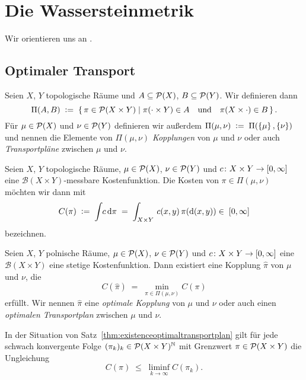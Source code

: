 \documentclass[../main/main.tex]{subfiles}
\begin{document}
	
	\section{Die Wassersteinmetrik}
	
	Wir orientieren uns an \cite{Villani.2009}.
	
	\subsection{Optimaler Transport}
	
	\begin{Definition}[Kopplung]
		Seien $X$, $Y$ topologische Räume und $A \subseteq \mathcal{P}(X)$, $B \subseteq \mathcal{P}(Y)$. Wir definieren dann
		\[ \Pi(A, B) \; \vcentcolon = \; \left\{\, \pi \in \mathcal{P}(X \times Y) \; \middle| \; \pi(\cdot \times Y) \in A \quad \text{und} \quad \pi(X \times \cdot) \in B \,\right\} \text{.}\]
		Für $\mu \in \mathcal{P}(X)$ und $\nu \in \mathcal{P}(Y)$ definieren wir außerdem $\Pi(\mu, \nu) \; \vcentcolon = \; \Pi(\left\{\mu\right\}, \left\{\nu\right\})$ und nennen die
		Elemente von $\Pi(\mu, \nu)$ \emph{Kopplungen} von $\mu$ und $\nu$ oder auch \emph{Transportpläne} zwischen $\mu$ und $\nu$.
	\end{Definition}

	\begin{Definition}
		Seien $X$, $Y$ topologische Räume, $\mu \in \mathcal{P}(X)$, $\nu \in \mathcal{P}(Y)$ und $c \colon X \times Y \to [0, \infty]$ eine $\mathcal{B}(X \times Y)$-messbare Kostenfunktion.
		Die Kosten von $\pi \in \Pi(\mu, \nu)$ möchten wir dann mit
		\[ C(\pi) \; \vcentcolon = \; \int_{} \, c \, \mathrm{d}\pi \; = \; \int_{X \times Y} \, c(x, y) \, \pi(\mathrm{d}(x, y)) \in \; [0, \infty] \]
		bezeichnen.
	\end{Definition}

	\begin{Satz}
		\label{thm:existenceoptimaltransportplan}
		Seien $X$, $Y$ polnische Räume, $\mu \in \mathcal{P}(X)$, $\nu \in \mathcal{P}(Y)$ und $c \colon X \times Y \to [0, \infty]$ eine $\mathcal{B}(X \times Y)$ eine stetige 
		Kostenfunktion. Dann existiert eine Kopplung $\hat{\pi}$ von $\mu$ und $\nu$, die 
		\[ C(\hat{\pi}) \; = \; \min_{\pi \in \Pi(\mu, \nu)} C(\pi) \]
		erfüllt. Wir nennen $\hat{\pi}$ eine \emph{optimale Kopplung} von $\mu$ und $\nu$ oder auch einen \emph{optimalen Transportplan} zwischen $\mu$ und $\nu$.
	\end{Satz}

	\begin{Hilfssatz}
		\label{lem:lsccost}
		In der Situation von Satz~\ref{thm:existenceoptimaltransportplan} gilt für jede schwach konvergente Folge $(\pi_k)_k \in \mathcal{P}(X \times Y)^{\mathbb{N}}$ mit Grenzwert $\pi \in \mathcal{P}(X \times Y)$ die Ungleichung
		\[ C(\pi) \; \leq \; \liminf_{k \to \infty} C(\pi_k) \text{.} \]
	\end{Hilfssatz}
\end{document}
